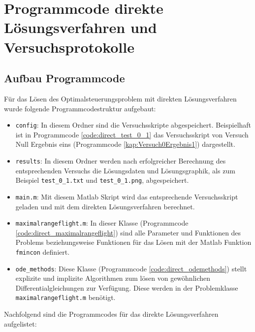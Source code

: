 \chapter{Programmcode direkte Lösungsverfahren und Versuchsprotokolle}

\section{Aufbau Programmcode}
Für das Lösen des Optimalsteuerungsproblem mit direkten Lösungsverfahren wurde folgende Programmcodestruktur aufgebaut:
\begin{itemize}
\item \texttt{config}: In diesem Ordner sind die Versuchsskripte abgespeichert. Beispielhaft ist in Programmcode \ref{code:direct_test_0_1} das Versuchsskript von Versuch Null Ergebnis eins (Programmcode \ref{kap:Versuch0Ergebnis1}) dargestellt.
%
\item \texttt{results}: In diesem Ordner werden nach erfolgreicher Berechnung des entsprechenden Versuchs die Lösungsdaten und Lösungsgraphik, als zum Beispiel \texttt{test\_0\_1.txt} und \texttt{test\_0\_1.png}, abgespeichert.
\item \texttt{main.m}: Mit diesem Matlab Skript wird das entsprechende Versuchsskript geladen und mit dem direkten Lösungsverfahren berechnet.
%
\item \texttt{maximalrangeflight.m}: In dieser Klasse (Programmcode \ref{code:direct_maximalrangeflight}) sind alle Parameter und Funktionen des Problems beziehungsweise Funktionen für das Lösen mit der Matlab Funktion \texttt{fmincon} definiert. 
%
\item \texttt{ode\_methods}: Diese Klasse (Programmcode \ref{code:direct_odemethods}) stellt explizite und implizite Algorithmen zum lösen von gewöhnlichen Differentialgleichungen zur Verfügung. Diese werden in der Problemklasse \texttt{maximalrangeflight.m} benötigt.
\end{itemize}
Nachfolgend sind die Programmcodes für das direkte Lösungsverfahren aufgelistet:

